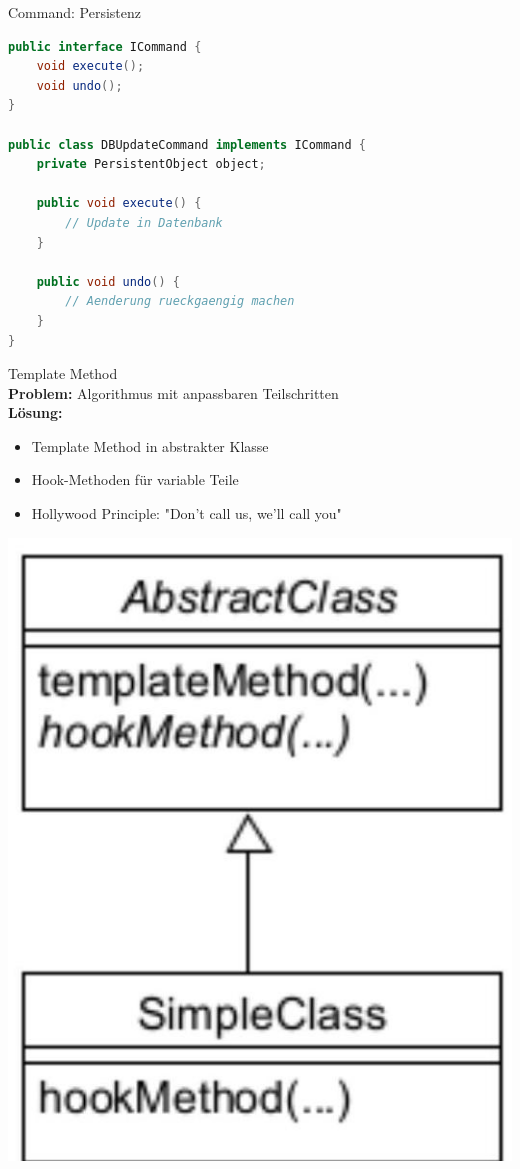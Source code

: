 \begin{example}{Command: Persistenz}
\begin{lstlisting}[language=Java, style=base]
public interface ICommand {
    void execute();
    void undo();
}

public class DBUpdateCommand implements ICommand {
    private PersistentObject object;
    
    public void execute() {
        // Update in Datenbank
    }
    
    public void undo() {
        // Aenderung rueckgaengig machen
    }
}
\end{lstlisting}
\end{example}

\begin{concept}{Template Method}\\
\textbf{Problem:} Algorithmus mit anpassbaren Teilschritten\\
\textbf{Lösung:}
\begin{itemize}
    \item Template Method in abstrakter Klasse
    \item Hook-Methoden für variable Teile
    \item Hollywood Principle: "Don't call us, we'll call you"
\end{itemize}
\includegraphics[width=0.8\linewidth]{images/2025_01_02_73d93f10fa91ab6123dcg-22}
\end{concept}

